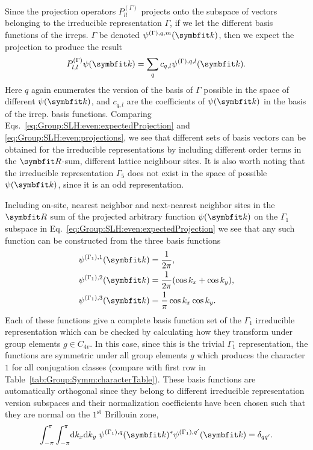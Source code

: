 %
Since the projection operators $P_{ll}^{(\Gamma)}$ projects onto the subspace of vectors belonging to the irreducible representation $\Gamma$, if we
let the different basis functions of the irreps. $\Gamma$ be denoted $\psi^{(\Gamma),q,m}(\v{k})$, then we expect the projection to produce the result
\begin{equation}
    \label{eq:Group:SLH:even:expectedProjection}
    P_{l,l}^{(\Gamma)}\psi(\v{k}) = \sum_{q}c_{q,l}\psi^{(\Gamma),q,l}(\v{k}).
\end{equation}
Here $q$ again enumerates the version of the basis of $\Gamma$ possible in the space of different $\psi(\v{k})$, and $c_{q,l}$ are the coefficients of
$\psi(\v{k})$ in the basis of the irrep. basis functions. Comparing Eqs.~\eqref{eq:Group:SLH:even:expectedProjection} and \eqref{eq:Group:SLH:even:projections},
we see that different sets of basis vectors can be obtained for the irreducible representations by including different order terms in the $\v{R}$-sum,
\ie different lattice neighbour sites. It is also worth noting that the irreducible representation $\Gamma_5$ does not exist in the space of possible $\psi(\v{k})$,
since it is an odd representation.

Including on-site, nearest neighbor and next-nearest neighbor sites in the $\v{R}$ sum of the projected arbitrary function $\psi(\v{k})$ on the $\Gamma_1$ subspace in
Eq.~\eqref{eq:Group:SLH:even:expectedProjection} we see that any such function can be constructed from the three basis functions
\begin{subequations}
    \label{eq:Group:SLH:even:G1basis}
    \begin{align}
        \label{eq:Group:SLH:even:G1basis:1}
        \psi^{(\Gamma_1),1}(\v{k}) &= \frac{1}{2\pi},\\
        \label{eq:Group:SLH:even:G1basis:2}
        \psi^{(\Gamma_1),2}(\v{k}) &= \frac{1}{2\pi}(\cos k_x + \cos k_y),\\
        \label{eq:Group:SLH:even:G1basis:3}
        \psi^{(\Gamma_1),3}(\v{k}) &= \frac{1}{\pi}\cos k_x \cos k_y.
    \end{align}
\end{subequations}
Each of these functions give a complete basis function set of the $\Gamma_1$ irreducible representation which can be checked by calculating how they transform under
group elements $g\in C_{4v}$. In this case, since this is the trivial $\Gamma_1$ representation, the functions are symmetric under all group elements $g$ which
produces the character $1$ for all conjugation classes (compare with first row in Table~\ref{tab:Group:Symm:characterTable}). These basis functions are automatically
orthogonal since they belong to different irreducible representation version subspaces and their normalization coefficients have been chosen such that they are normal
on the $1^\text{st}$ Brillouin zone, \ie
\begin{equation}
    \label{eq:Group:SLH:even:G1orthonormal}
    \int_{-\pi}^\pi\int_{-\pi}^\pi\!\textrm{d}k_x\textrm{d}k_y\;\psi^{(\Gamma_1),q}(\v{k})^\ast\psi^{(\Gamma_1),q'}(\v{k}) = \delta_{qq'}.
\end{equation}

